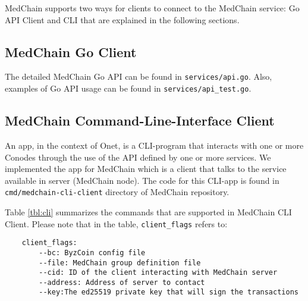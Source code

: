 MedChain supports two ways for clients to connect to the MedChain service: Go API Client and CLI that are explained in the following sections.

\subsection{MedChain Go Client}
The detailed MedChain Go API can be found in \texttt{services/api.go}. Also, examples of Go API usage can be found in \texttt{services/api\_test.go}.

\subsection{MedChain Command-Line-Interface Client}
An app, in the context of Onet, is a CLI-program that interacts with one or more Conodes through the use of the API defined by one or more services. 
We implemented the app for MedChain which is a client that talks to the service available in server (MedChain node). The code for this CLI-app is found in \texttt{cmd/medchain-cli-client} directory of MedChain repository. 

Table \ref{tbl:cli} summarizes the commands that are supported in MedChain CLI Client. Please note that in the table, \texttt{client\_flags} refers to:
    \begin{verbatim}
    client_flags:
        --bc: ByzCoin config file
        --file: MedChain group definition file
        --cid: ID of the client interacting with MedChain server
        --address: Address of server to contact
        --key:The ed25519 private key that will sign the transactions
    \end{verbatim}

